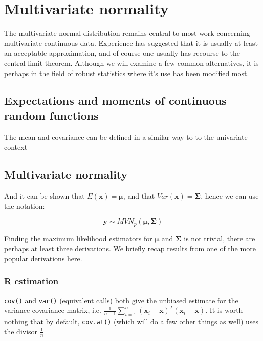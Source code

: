 \chapter{Multivariate normality}
\label{mvn}

The multivariate normal distribution remains central to most work concerning multivariate continuous data.   Experience has suggested that it is usually at least an acceptable approximation, and of course one usually has recourse to the central limit theorem.   Although we will examine a few common alternatives, it is perhaps in the field of robust statistics where it's use has been modified most.

\section{Expectations and moments of continuous random functions}
\label{meancovar}

The mean and covariance can be defined in a similar way to to the univariate context




\section{Multivariate normality}
\label{mvndetail}



And it can be shown that $E(\boldsymbol{x}) = \boldsymbol{\mu}$, and that $Var(\boldsymbol{x}) = \boldsymbol{\Sigma}$, hence we can use the notation:

\begin{displaymath}
\boldsymbol{y} \sim MVN_{p}(\boldsymbol{\mu}, \boldsymbol{\Sigma})
\end{displaymath}

Finding the maximum likelihood estimators for $\boldsymbol{\mu}$ and $\boldsymbol{\Sigma}$ is not trivial, there are perhaps at least three derivations.   We briefly recap results from one of the more popular derivations here.



\subsection{\textbf{R} estimation}

\verb+cov()+ and \verb+var()+ (equivalent calls) both give the unbiased estimate for the variance-covariance matrix, i.e. $\frac{1}{n-1} \sum_{i=1}^{n}(\boldsymbol{x}_{i} - \bar{\boldsymbol{x}})^{T}(\boldsymbol{x}_{i} - \bar{\boldsymbol{x}})$.   It is worth nothing that by default, \verb+cov.wt()+ (which will do a few other things as well) uses the divisor $\frac{1}{n}$


